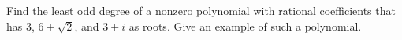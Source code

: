 Find the least odd degree of a nonzero polynomial with rational coefficients that has $3$, $6+\sqrt2$, and $3+i$ as roots. Give an example of such a polynomial.
